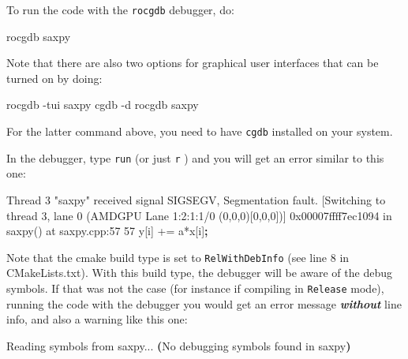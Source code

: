 \documentclass[
]{article}
\let\oldtexttt\texttt
\renewcommand{\texttt}[1]{
  \colorbox{Light}{\oldtexttt{#1}}
}
\newenvironment{Shaded}{}{}
\newcommand{\ExtensionTok}[1]{#1}
\newcommand{\KeywordTok}[1]{\textcolor[rgb]{0.00,0.44,0.13}{\textbf{#1}}}
\newcommand{\NormalTok}[1]{#1}
\newcommand{\StringTok}[1]{\textcolor[rgb]{0.25,0.44,0.63}{#1}}
\begin{document}
To run the code with the \texttt{rocgdb} debugger, do:

\begin{Shaded}
\begin{Highlighting}[]
\ExtensionTok{rocgdb}\NormalTok{ saxpy}
\end{Highlighting}
\end{Shaded}

Note that there are also two options for graphical user interfaces that
can be turned on by doing:

\begin{Shaded}
\begin{Highlighting}[]
\ExtensionTok{rocgdb}\NormalTok{ {-}tui saxpy}
\ExtensionTok{cgdb}\NormalTok{ {-}d rocgdb saxpy }
\end{Highlighting}
\end{Shaded}

For the latter command above, you need to have \texttt{cgdb} installed
on your system.

In the debugger, type \texttt{run} (or just \texttt{r}) and you will get
an error similar to this one:

\begin{Shaded}
\begin{Highlighting}[]
\ExtensionTok{Thread}\NormalTok{ 3 }\StringTok{"saxpy"}\NormalTok{ received signal SIGSEGV, Segmentation fault.}
\NormalTok{[}\ExtensionTok{Switching}\NormalTok{ to thread 3, lane 0 (AMDGPU Lane 1:2:1:1/0 (0,0,0)[}\ExtensionTok{0}\NormalTok{,0,0])]}
\ExtensionTok{0x00007ffff7ec1094}\NormalTok{ in saxpy() }\ExtensionTok{at}\NormalTok{ saxpy.cpp:57}
\ExtensionTok{57}\NormalTok{    y[i] += a*x[i]}\KeywordTok{;}
\end{Highlighting}
\end{Shaded}

Note that the cmake build type is set to \texttt{RelWithDebInfo} (see
line 8 in CMakeLists.txt). With this build type, the debugger will be
aware of the debug symbols. If that was not the case (for instance if
compiling in \texttt{Release} mode), running the code with the debugger
you would get an error message \textbf{\emph{without}} line info, and
also a warning like this one:

\begin{Shaded}
\begin{Highlighting}[]
\ExtensionTok{Reading}\NormalTok{ symbols from saxpy...}
\KeywordTok{(}\ExtensionTok{No}\NormalTok{ debugging symbols found in saxpy}\KeywordTok{)}
\end{Highlighting}
\end{Shaded}
\end{document}
